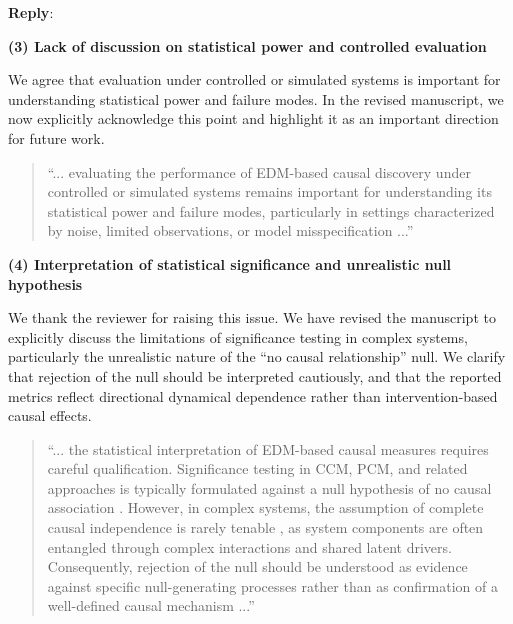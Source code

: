 \documentclass[11pt]{article}
\newcounter{reviewer}
\newcounter{point}[reviewer]
\newenvironment{reply}
   {\medskip \noindent \color{blue} \begin{sf}\textbf{Reply}:\  }
   {\medskip \par \end{sf}}
\begin{document}
\begin{reply}
\vspace{0.5em}

\textbf{(3) Lack of discussion on statistical power and controlled evaluation}

We agree that evaluation under controlled or simulated systems is important for understanding statistical power and failure modes. In the revised manuscript, we now explicitly acknowledge this point and highlight it as an important direction for future work.

\vspace{0.5em}

\begingroup
\color{red}\itshape
\begin{quote}
``... evaluating the performance of EDM-based causal discovery under controlled or simulated systems remains important for understanding its statistical power and failure modes, particularly in settings characterized by noise, limited observations, or model misspecification ...''
\end{quote}
\endgroup

\vspace{0.5em}

\textbf{(4) Interpretation of statistical significance and unrealistic null hypothesis}

We thank the reviewer for raising this issue. We have revised the manuscript to explicitly discuss the limitations of significance testing in complex systems, particularly the unrealistic nature of the ``no causal relationship'' null. We clarify that rejection of the null should be interpreted cautiously, and that the reported metrics reflect directional dynamical dependence rather than intervention-based causal effects.

\vspace{0.5em}

\begingroup
\color{red}\itshape
\begin{quote}
``... the statistical interpretation of EDM-based causal measures requires careful qualification. Significance testing in CCM, PCM, and related approaches is typically formulated against a null hypothesis of no causal association \citep{tao2023cmc}. However, in complex systems, the assumption of complete causal independence is rarely tenable \citep{meehl1990all_cor_vars}, as system components are often entangled through complex interactions and shared latent drivers. Consequently, rejection of the null should be understood as evidence against specific null-generating processes rather than as confirmation of a well-defined causal mechanism ...''
\end{quote}
\endgroup


\end{reply}
\end{document}
